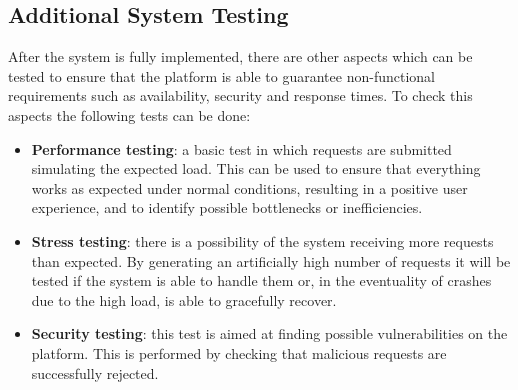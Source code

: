 \subsection{Additional System Testing}
After the system is fully implemented, there are other aspects which can be tested to ensure that the platform is able to guarantee non-functional requirements such as availability, security and response times. To check this aspects the following tests can be done:
\begin{itemize}
    \item \textbf{Performance testing}: a basic test in which requests are submitted simulating the expected load. This can be used to ensure that everything works as expected under normal conditions, resulting in a positive user experience, and to identify possible bottlenecks or inefficiencies.
    \item \textbf{Stress testing}: there is a possibility of the system receiving more requests than expected. By generating an artificially high number of requests it will be tested if the system is able to handle them or, in the eventuality of crashes due to the high load, is able to gracefully recover.
    \item \textbf{Security testing}: this test is aimed at finding possible vulnerabilities on the platform. This is performed by checking that malicious requests are successfully rejected.
\end{itemize}
